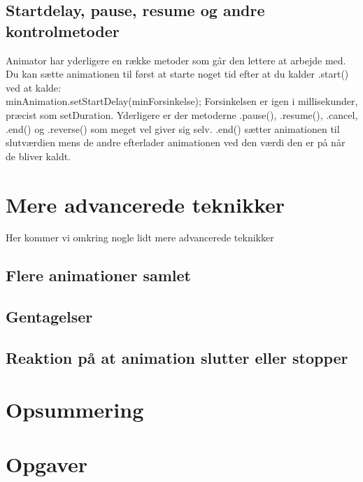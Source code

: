 \subsection{Startdelay, pause, resume og andre kontrolmetoder}
Animator har yderligere en række metoder som går den lettere at arbejde med. Du kan sætte animationen til først at starte noget tid efter at du kalder .start() ved at kalde: \\
minAnimation.setStartDelay(minForsinkelse);
Forsinkelsen er igen i millisekunder, præcist som setDuration. 
Yderligere er der metoderne .pause(), .resume(), .cancel,  .end() og .reverse() som meget vel giver sig selv. .end() sætter animationen til slutværdien mens de andre efterlader animationen ved den værdi den er på når de bliver kaldt.
\section{Mere advancerede teknikker}
Her kommer vi omkring nogle lidt mere advancerede teknikker
\subsection{Flere animationer samlet}
\subsection{Gentagelser}
\subsection{Reaktion på at animation slutter eller stopper}
\section{Opsummering}
\section{Opgaver}